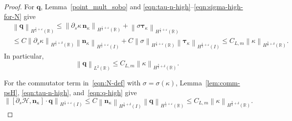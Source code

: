 \documentclass[11pt,reqno]{amsart}
\theoremstyle{plain}
\theoremstyle{definition}
\numberwithin{equation}{section}
\newcommand{\p}{\partial}
\newcommand{\mc}[1]{\mathcal{#1}}
\newcommand{\bm}[1]{\boldsymbol{#1}}
\newcommand{\norm}[1]{\left\lVert #1 \right\rVert}
\newcommand{\R}{\mathbb{R}}
\newcommand{\tk}{\bm\tau_\kappa}
\newcommand{\nk}{\bm n_\kappa}
\newcommand{\hi}[1]{H^{#1}(I)}
\newcommand{\hr}[1]{H^{#1}(\R)}
\begin{document}
\begin{proof}
For $\bm q$, Lemma~\ref{point_mult_sobo} and
\eqref{eqn:tau-n-high}--\eqref{eqn:sigma-high-for-N} give
\begin{equation}\label{eqn:q-high}
\begin{aligned}
    &\norm{\bm q}_{\hr{\frac{1}{2}+\varepsilon}} \le \norm{\p_s\kappa\,\nk}_{\hr{\frac{1}{2}+\varepsilon}} +
    \norm{\sigma\tk}_{\hr{\frac{1}{2}+\varepsilon}} \\
    &\le C\norm{\p_s\kappa}_{\hr{\frac{1}{2}+\delta}} \norm{\nk}_{\hi{\frac{1}{2}+\varepsilon}} +
    C\norm{\sigma}_{\hr{\frac{1}{2}+\varepsilon}} \norm{\tk}_{\hi{\frac{1}{2}+\varepsilon}} \le C_{L,m}
    \norm{\kappa}_{\hr{\frac{3}{2}+\delta}} .
\end{aligned}
\end{equation}
In particular,
\begin{equation}\label{eqn:q-L2-high}
    \norm{\bm q}_{L^2(\R)}
    \le C_{L,m}
        \norm{\kappa}_{\hr{\frac{3}{2}+\delta}} .
\end{equation}

For the commutator term in~\eqref{eqn:N-def} with $\sigma=\sigma(\kappa)$,
Lemma~\ref{lem:comm-psH}, \eqref{eqn:tau-n-high}, and~\eqref{eqn:q-high} give
\begin{equation}\label{eqn:N-comm-high}
    \norm{[\p_s\mc H,\nk]\cdot\bm q}_{\hi{\frac{1}{2}+\varepsilon}} \le C\norm{\nk}_{\hi{\frac{5}{2}+\delta}}
    \norm{\bm q}_{\hr{\frac{1}{2}+\varepsilon}} \le C_{L,m} \norm{\kappa}_{\hr{\frac{3}{2}+\delta}} .
\end{equation}


\end{proof}
\end{document}
